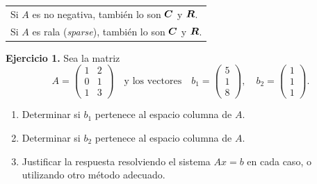 \documentclass[12pt,a4paper]{article}
\newcommand{\bi}[1]{\hbox{\boldmath$#1$}}
\newcommand\1{\mbox{\,\vrule height-0.8pt depth1.0pt width2pc\,}}
\newcommand\2{\mbox{\,\vrule height-0.8pt depth1.0pt width1pc\,}}
\begin{document}
\begin{enumerate}
\hfil\begin{tabular}{l}
Si $A$ es no negativa,\index[indx]{No negativa} también lo son $\bi{C}$ y $\bi{R}$. \\
Si $A$ es rala (\emph{sparse}),\index[indx]{Rala}\index[indx]{Sparse} también lo son $\bi{C}$ y $\bi{R}$.
\end{tabular}

\end{enumerate}





\textbf{Ejercicio 1.} Sea la matriz
\[
A = \begin{pmatrix}
1 & 2 \\
0 & 1 \\
1 & 3
\end{pmatrix}
\quad \text{y los vectores} \quad
b_1 = \begin{pmatrix} 5 \\ 1 \\ 8 \end{pmatrix},
\quad
b_2 = \begin{pmatrix} 1 \\ 1 \\ 1 \end{pmatrix}.
\]
\begin{enumerate}
    \item Determinar si $b_1$ pertenece al espacio columna de $A$.
    \item Determinar si $b_2$ pertenece al espacio columna de $A$.
    \item Justificar la respuesta resolviendo el sistema $Ax = b$ en cada caso, o utilizando otro método adecuado.
\end{enumerate}

\vspace{0.5cm}
\end{document}
